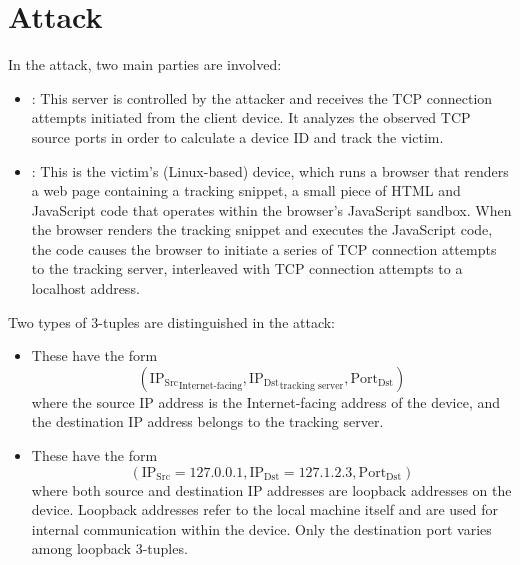 \documentclass{report}
\begin{document}
\vspace{0.5cm}
\chapter{Attack}
\label{sec:attack}

In the attack, two main parties are involved:

\begin{itemize}
    \item {}: This server is controlled by the \alert{attacker} and receives the TCP connection attempts initiated from the client device. It analyzes the observed TCP source ports in order to calculate a device ID and track the victim.%
    
    \item {}: This is the \alert{victim’s} (Linux-based) device, which runs a browser that renders a web page containing a \alert{tracking snippet}, a small piece of HTML and JavaScript code that operates within the browser’s JavaScript sandbox. When the browser renders the tracking snippet and executes the JavaScript code, the code causes the browser to initiate a series of TCP connection attempts to the \alert{tracking server}, interleaved with TCP connection attempts to a \alert{localhost address}.
\end{itemize}

Two types of 3-tuples are distinguished in the attack:

\begin{itemize}
	\item {} These have the form
	\begin{equation*}
		(\mathrm{IP_{Src}}_{\text{Internet-facing}}, \mathrm{IP_{Dst}}_{\text{tracking server}}, \mathrm{Port_{Dst}})
	\end{equation*}
	where the source IP address is the Internet-facing address of the device, and the destination IP address belongs to the tracking server.

	\item {} These have the form
	\begin{equation*}
		(\mathrm{IP_{Src}} = 127.0.0.1, \mathrm{IP_{Dst}} = 127.1.2.3, \mathrm{Port_{Dst}})
	\end{equation*}
	where both source and destination IP addresses are loopback addresses on the device. \alert{Loopback addresses} refer to the local machine itself and are used for internal communication within the device. Only the \alert{destination port} varies among loopback 3-tuples.
\end{itemize}
\end{document}
